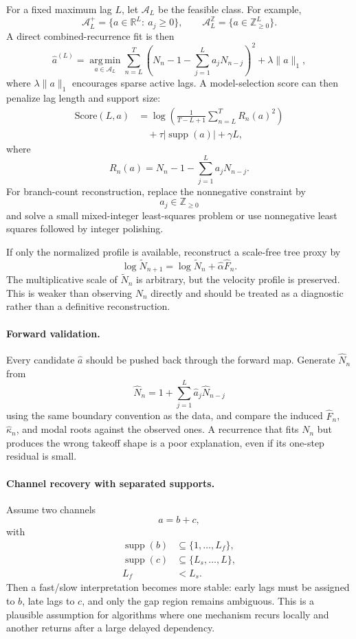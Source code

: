 \documentclass[10pt,twocolumn]{article}
\newcommand{\ZZ}{\mathbb{Z}}
\newcommand{\RR}{\mathbb{R}}
\newcommand{\argmin}{\operatorname*{arg\,min}}
\newcommand{\supp}{\operatorname{supp}}
\begin{document}
For a fixed maximum lag \(L\), let \(\mathcal{A}_L\) be the feasible class. For
example,
\[
        \mathcal{A}_L^{+}
        =
        \{a\in\RR^L:\ a_j\ge0\},
        \qquad
        \mathcal{A}_L^{\ZZ}
        =
        \{a\in\ZZ_{\ge0}^{L}\}.
\]
A direct combined-recurrence fit is then
\[
        \widehat a^{(L)}
        =
        \argmin_{a\in\mathcal{A}_L}
        \sum_{n=L}^{T}
        \left(
            N_n-1-\sum_{j=1}^{L}a_jN_{n-j}
        \right)^2
        +\lambda\|a\|_1,
\]
where \(\lambda\|a\|_1\) encourages sparse active lags. A model-selection score
can then penalize lag length and support size:
\[
        \begin{aligned}
        \mathrm{Score}(L,a)
        &=
        \log\left(\frac{1}{T-L+1}
        \sum_{n=L}^{T}R_n(a)^2\right)\\
        &\quad
        +\tau |\supp(a)|+\gamma L,
        \end{aligned}
\]
where
\[
        R_n(a)=N_n-1-\sum_{j=1}^{L}a_jN_{n-j}.
\]
For branch-count reconstruction, replace the nonnegative constraint by
\[
        a_j\in\ZZ_{\ge0}
\]
and solve a small mixed-integer least-squares problem or use nonnegative least
squares followed by integer polishing.

If only the normalized profile is available, reconstruct a scale-free tree
proxy by
\[
        \log \widetilde N_{n+1}
        =
        \log \widetilde N_n+\widehat{\alpha}\widehat F_n.
\]
The multiplicative scale of \(\widetilde N_n\) is arbitrary, but the velocity
profile is preserved. This is weaker than observing \(N_n\) directly and should
be treated as a diagnostic rather than a definitive reconstruction.

\paragraph{Forward validation.}
Every candidate \(\widehat a\) should be pushed back through the forward map.
Generate \(\widehat N_n\) from
\[
        \widehat N_n
        =
        1+\sum_{j=1}^{L}\widehat a_j\widehat N_{n-j}
\]
using the same boundary convention as the data, and compare the induced
\(\widehat F_n\), \(\widehat\kappa_n\), and modal roots against the observed
ones. A recurrence that fits \(N_n\) but produces the wrong takeoff shape is a
poor explanation, even if its one-step residual is small.

\paragraph{Channel recovery with separated supports.}
Assume two channels
\[
        a=b+c,
\]
with
\[
        \begin{aligned}
        \supp(b)&\subseteq \{1,\ldots,L_f\},\\
        \supp(c)&\subseteq \{L_s,\ldots,L\},\\
        L_f&<L_s.
        \end{aligned}
\]
Then a fast/slow interpretation becomes more stable: early lags must be
assigned to \(b\), late lags to \(c\), and only the gap region remains
ambiguous. This is a plausible assumption for algorithms where one mechanism
recurs locally and another returns after a large delayed dependency.
\end{document}
